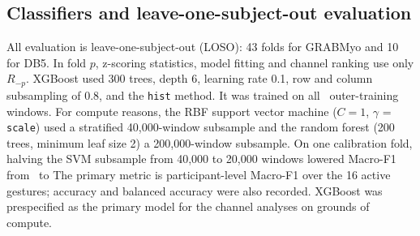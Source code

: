 \subsection{Classifiers and leave-one-subject-out evaluation}
All evaluation is leave-one-subject-out (LOSO): 43 folds for GRABMyo and 10 for DB5. In fold $p$, z-scoring statistics, model fitting and channel ranking use only $R_{-p}$.  XGBoost used 300 trees, depth 6, learning rate 0.1, row and column subsampling of 0.8, and the \texttt{hist} method. It was trained on all \FoldTrainingWindows\ outer-training windows. For compute reasons, the RBF support vector machine ($C = 1$, $\gamma$ = \texttt{scale}) used a stratified 40,000-window subsample and the random forest (200 trees, minimum leaf size 2) a 200,000-window subsample. On one calibration fold, halving the SVM subsample from 40,000 to 20,000 windows lowered Macro-F1 from \SVMCalibFortyK\ to \SVMCalibTwentyK{} The primary metric is participant-level Macro-F1 over the 16 active gestures; accuracy and balanced accuracy were also recorded. XGBoost was prespecified as the primary model for the channel analyses on grounds of compute.

